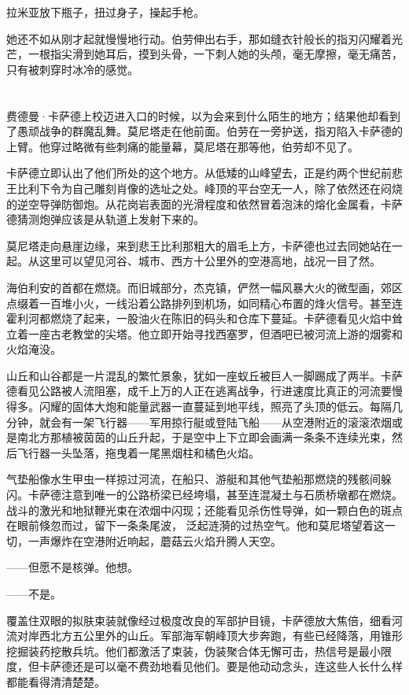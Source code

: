 \documentclass[AutoFakeBold=true]{book}
\begin{document}
拉米亚放下瓶子，扭过身子，操起手枪。

她还不如从刚才起就慢慢地行动。伯劳伸出右手，那如缝衣针般长的指刃闪耀着光芒，一根指尖滑到她耳后，摸到头骨，一下刺人她的头颅，毫无摩擦，毫无痛苦，只有被刺穿时冰冷的感觉。

\chapter{}

费德曼·卡萨德上校迈进入口的时候，以为会来到什么陌生的地方；结果他却看到了愚顽战争的群魔乱舞。莫尼塔走在他前面。伯劳在一旁护送，指刃陷入卡萨德的上臂。他穿过略微有些刺痛的能量幕，莫尼塔在那等他，伯劳却不见了。

卡萨德立即认出了他们所处的这个地方。从低矮的山峰望去，正是约两个世纪前悲王比利下令为自己雕刻肖像的选址之处。峰顶的平台空无一人，除了依然还在闷烧的逆空导弹防御炮。从花岗岩表面的光滑程度和依然冒着泡沫的熔化金属看，卡萨德猜测炮弹应该是从轨道上发射下来的。

莫尼塔走向悬崖边缘，来到悲王比利那粗大的眉毛上方，卡萨德也过去同她站在一起。从这里可以望见河谷、城市、西方十公里外的空港高地，战况一目了然。

海伯利安的首都在燃烧。而旧城部分，杰克镇，俨然一幅风暴大火的微型画，郊区点缀着一百堆小火，一线沿着公路排列到机场，如同精心布置的烽火信号。甚至连霍利河都燃烧了起来，一股油火在陈旧的码头和仓库下蔓延。卡萨德看见火焰中耸立着一座古老教堂的尖塔。他立即开始寻找西塞罗，但酒吧已被河流上游的烟雾和火焰淹没。

山丘和山谷都是一片混乱的繁忙景象，犹如一座蚁丘被巨人一脚踢成了两半。卡萨德看见公路被人流阻塞，成千上万的人正在逃离战争，行进速度比真正的河流要慢得多。闪耀的固体大炮和能量武器一直蔓延到地平线，照亮了头顶的低云。每隔几分钟，就会有一架飞行器——军用掠行艇或登陆飞船——从空港附近的滚滚浓烟或是南北方那植被茵茵的山丘升起，于是空中上下立即会画满一条条不连续光束，然后飞行器一头坠落，拖曳着一尾黑烟柱和橘色火焰。

气垫船像水生甲虫一样掠过河流，在船只、游艇和其他气垫船那燃烧的残骸间躲闪。卡萨德注意到唯一的公路桥梁已经垮塌，甚至连混凝土与石质桥墩都在燃烧。战斗的激光和地狱鞭光束在浓烟中闪现；还能看见杀伤性导弹，如一颗白色的斑点在眼前倏忽而过，留下一条条尾波， 泛起涟漪的过热空气。他和莫尼塔望着这一切，一声爆炸在空港附近响起，蘑菇云火焰升腾人天空。

{\kaishu ——但愿不是核弹。}他想。

{\kaishu ——不是。}

覆盖住双眼的拟肤束装就像经过极度改良的军部护目镜，卡萨德放大焦倍，细看河流对岸西北方五公里外的山丘。军部海军朝峰顶大步奔跑，有些已经降落，用锥形挖掘装药挖散兵坑。他们都激活了束装，伪装聚合体无懈可击，热信号是最小限度，但卡萨德还是可以毫不费劲地看见他们。要是他动动念头，连这些人长什么样都能看得清清楚楚。
\end{document}
